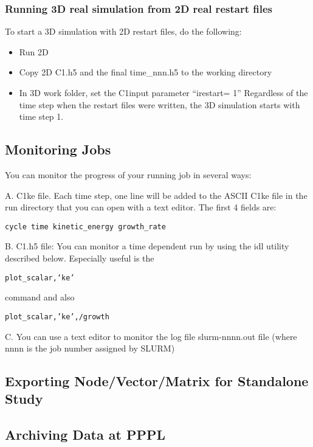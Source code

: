 \subsubsection{Running 3D real simulation from 2D real restart files}
To start a 3D simulation with 2D restart files, do the following:
\begin{itemize}
\item  Run 2D
\item  Copy 2D C1.h5 and the final time\_nnn.h5 to the working directory
\item  In 3D work folder, set the C1input parameter “irestart= 1”
Regardless of the time step when the restart files were written, the 3D simulation starts with time step 1. 
\end{itemize}

\subsection{Monitoring Jobs}
You can monitor the progress of your running job in several ways:

A. C1ke file. Each time step, one line will be added to the ASCII C1ke file in the run directory that you can open with a text editor. The first 4 fields are:

\begin{verbatim}
cycle time kinetic_energy growth_rate
\end{verbatim}

B. C1.h5 file: You can monitor a time dependent run by using the idl utility described below.  Especially useful is the 

\begin{verbatim}
plot_scalar,‘ke’
\end{verbatim}

\noindent
command and also 

\begin{verbatim}
plot_scalar,’ke’,/growth
\end{verbatim}

C. You can use a text editor to monitor the log file slurm-nnnn.out file (where nnnn is the job number assigned by SLURM)

\subsection{Exporting Node/Vector/Matrix for Standalone Study}
\subsection{Archiving Data at PPPL}

